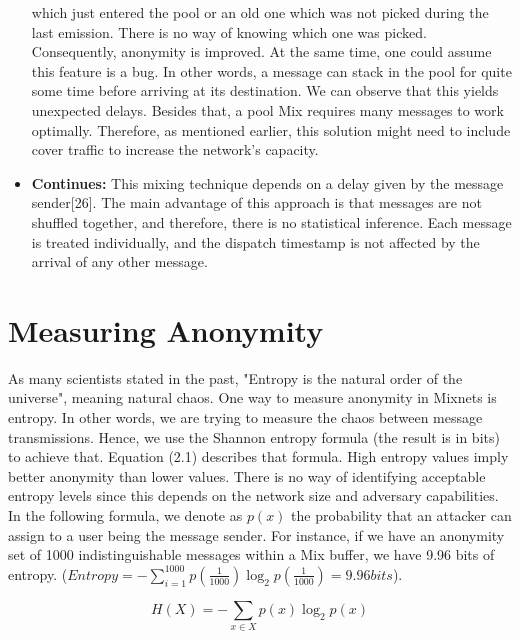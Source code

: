 \documentclass[logo,msc,cyber]{infthesis}   %
\begin{document}
\begin{itemize}
   which just entered the pool or an old one which was not picked during the
   last emission. There is no way of knowing which one was picked. Consequently,
   anonymity is improved. At the same time, one could assume this feature is a
   bug. In other words, a message can stack in the pool for quite some time
   before arriving at its destination. We can observe that this yields
   unexpected delays. Besides that, a pool Mix requires many messages to work
   optimally. Therefore, as mentioned earlier, this solution might need to
   include cover traffic to increase the network's capacity.
   \item \textbf{Continues:} This mixing technique depends on a delay given by the
   message sender[26]. The main advantage of this approach is that messages are not
   shuffled together, and therefore, there is no statistical inference. Each
   message is treated individually, and the dispatch timestamp is not affected
   by the arrival of any other message.
\end{itemize}

\section{Measuring Anonymity}

As many scientists stated in the past, "Entropy is the natural order of the
universe", meaning natural chaos. One way to measure anonymity in Mixnets is
entropy. In other words, we are trying to measure the chaos between message
transmissions. Hence, we use the Shannon entropy formula (the result is in bits)
to achieve that. Equation (2.1) describes that formula. High entropy values
imply better anonymity than lower values. There is no way of identifying
acceptable entropy levels since this depends on the network size and adversary
capabilities. In the following formula, we denote as $p(x)$ the probability that
an attacker can assign to a user being the message sender. For instance, if we
have an anonymity set of 1000 indistinguishable messages within a Mix buffer, we
have 9.96 bits of entropy.  ($Entropy = -\sum_{i = 1}^{1000}p(\frac{1}{1000})
\log_2p(\frac{1}{1000}) = 9.96 bits$). 

\begin{equation}
    \label{eq:entropy}
    H(X) = -\sum_{x \in X} p(x) \log_2p(x)     
\end{equation}
\end{document}
